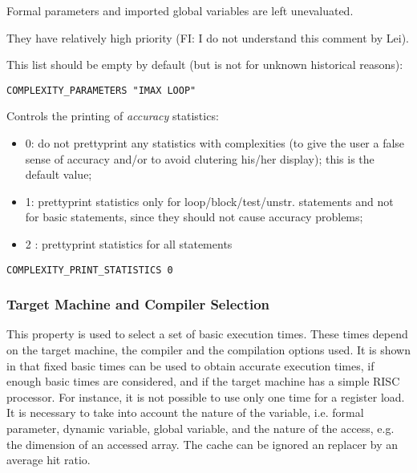 Formal parameters and imported global variables are left unevaluated.

They have relatively high priority (FI: I do not understand this comment
by Lei).

This list should be empty by default (but is not for unknown historical
reasons):

\begin{verbatim}
COMPLEXITY_PARAMETERS "IMAX LOOP"
\end{verbatim}

Controls the printing of {\em accuracy} statistics:

\begin{itemize}

  \item 0: do not prettyprint any statistics with complexities (to give
the user a false sense of accuracy and/or to avoid clutering his/her
display); this is the default value;

  \item 1: prettyprint statistics only for loop/block/test/unstr.
statements and not for basic statements, since they should not cause
accuracy problems;

  \item 2 : prettyprint statistics for all statements

\end{itemize}

\begin{verbatim}
COMPLEXITY_PRINT_STATISTICS 0
\end{verbatim}

\subsubsection{Target Machine and Compiler Selection}

This property is used to select a set of basic execution times. These
times depend on the target machine, the compiler and the compilation
options used. It is shown in \cite{Z94} that fixed basic times can be
used to obtain accurate execution times, if enough basic times are
considered, and if the target machine has a simple RISC processor. For
instance, it is not possible to use only one time for a register
load. It is necessary to take into account the nature of the variable,
i.e. formal parameter, dynamic variable, global variable, and the nature
of the access, e.g. the dimension of an accessed array. The cache can be
ignored an replacer by an average hit ratio.

